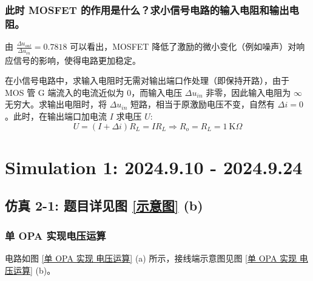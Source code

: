 \documentclass[UTF8]{report}
\def\kO{\ \mathrm{K}\Omega}
\theoremstyle{MyLineTheoremStyle} %
\theoremstyle{MyBlockTheoremStyle} %
\theoremstyle{MySubsubsectionStyle} %
\begin{document}
\subsection{此时 MOSFET 的作用是什么？求小信号电路的输入电阻和输出电阻。}
由 $\frac{\Delta u_{out}}{\Delta u_{in}} = 0.7818$ 可以看出，MOSFET 降低了激励的微小变化（例如噪声）对响应信号的影响，使得电路更加稳定。

在小信号电路中，求输入电阻时无需对输出端口作处理（即保持开路），由于 MOS 管 G 端流入的电流近似为 0，而输入电压 $\Delta u_{in}$ 非零，因此输入电阻为 $\infty$ 无穷大。求输出电阻时，将 $\Delta u_{in}$ 短路，相当于原激励电压不变，自然有 $\Delta i = 0$。此时，在输出端口加电流 $I$ 求电压 $U$:
\begin{equation}
U = \left(I + \Delta i\right)R_L = IR_L \Longrightarrow R_o = R_L = 1 \kO
\end{equation}















\chapter{Simulation 1: 2024.9.10 - 2024.9.24}
\thispagestyle{fancy}

\section{仿真 2-1: 题目详见图 \ref{示意图} (b)}

\subsection{单 OPA 实现电压运算}

电路如图 \ref{单 OPA 实现 电压运算} (a) 所示，接线端示意图见图 \ref{单 OPA 实现 电压运算} (b)。
\end{document}
